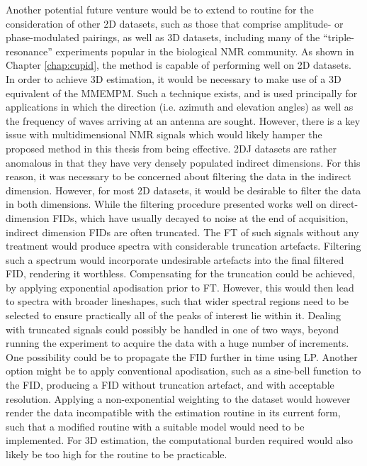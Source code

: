 Another potential future venture would be to extend to routine for the
consideration of other \ac{2D} datasets, such as those that comprise
amplitude- or phase-modulated pairings, as well as \ac{3D} datasets,
including many of the ``triple-resonance'' experiments popular in the
biological \ac{NMR} community\cite[Section 7.4]{Cavanagh2007}. As shown in
Chapter \ref{chap:cupid}, the method is capable of performing well on \ac{2D}
datasets. In order to achieve \ac{3D} estimation, it would be necessary to
make use of a \ac{3D} equivalent of the \ac{MMEMPM}. Such a technique exists,
and is used principally for applications in which the direction (i.e. azimuth
and elevation angles) as well as the frequency of waves arriving at an antenna
are sought\cite{Yilmazer2006}. However, there is a key issue with
multidimensional \ac{NMR} signals which would likely hamper the proposed method
in this thesis from being effective. \ac{2DJ} datasets are rather anomalous in
that they have very densely populated indirect dimensions. For this reason, it
was necessary to be concerned about filtering the data in the indirect
dimension. However, for most \ac{2D} datasets, it would be desirable to filter
the data in both dimensions. While the filtering procedure presented works well
on direct-dimension \acp{FID}, which have usually decayed to noise at the end
of acquisition, indirect dimension \acp{FID} are often truncated. The \ac{FT}
of such signals without any treatment would produce spectra with considerable
truncation artefacts. Filtering such a spectrum would incorporate undesirable
artefacts into the final filtered \ac{FID}, rendering it worthless.
Compensating for the truncation could be achieved, by applying exponential
apodisation prior to \ac{FT}. However, this would then lead to spectra with
broader lineshapes, such that wider spectral regions need to be selected to
ensure practically all of the peaks of interest lie within it. Dealing with
truncated signals could possibly be handled in one of two ways, beyond running
the experiment to acquire the data with a huge number of increments. One
possibility could be to propagate the \ac{FID} further in time using \ac{LP}.
Another option might be to apply conventional apodisation, such as a sine-bell
function to the \ac{FID}, producing a \ac{FID} without truncation artefact, and
with acceptable resolution. Applying a non-exponential weighting to the dataset
would however render the data incompatible with the estimation routine in its
current form, such that a modified routine with a suitable model would need to
be implemented. For \ac{3D} estimation, the computational burden required would
also likely be too high for the routine to be practicable. 
